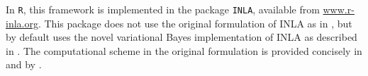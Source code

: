 In \texttt{R}, this framework is implemented in the package \texttt{INLA}, available from \href{www.r-inla.org}{www.r-inla.org}. This package does not use the original formulation of INLA as in \cite{Original-INLA}, but by default uses the novel variational Bayes implementation of INLA as described in \cite{vanniekerk2023lowrank}. The computational scheme in the original formulation is provided concisely in \citep{Prosjektoppgave} and by \cite{R-INLA}.




